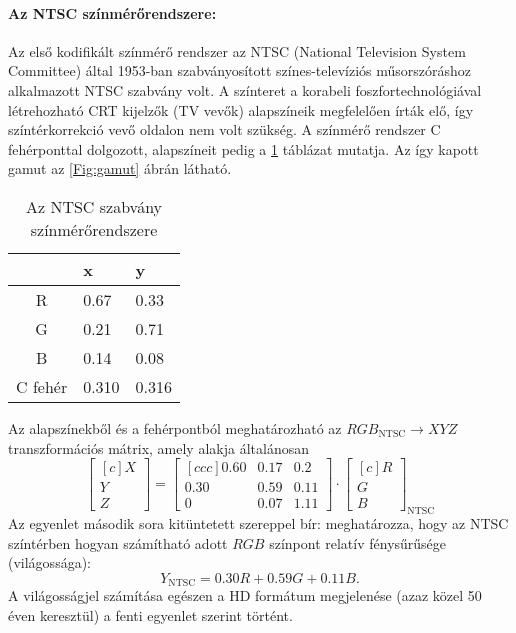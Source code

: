 \paragraph{Az NTSC színmérőrendszere:\\}
Az első kodifikált színmérő rendszer az NTSC (National Television System Committee) által 1953-ban szabványosított színes-televíziós műsorszóráshoz alkalmazott NTSC szabvány volt.
A színteret a korabeli foszfortechnológiával létrehozható CRT kijelzők (TV vevők) alapszíneik megfelelően írták elő, így színtérkorrekció vevő oldalon nem volt szükség.
A színmérő rendszer C fehérponttal dolgozott, alapszíneit pedig a \ref{tab:ntsc_colorimetry} táblázat mutatja.
Az így kapott gamut az \ref{Fig:gamut} ábrán látható.
\begin{table}[h!]
\caption{Az NTSC szabvány színmérőrendszere}
\renewcommand*{\arraystretch}{1}
\label{tab:ntsc_colorimetry}
\begin{center}
\small\addtolength{\tabcolsep}{15pt}
    \begin{tabular}[h!]{ @{}c | | l | l @{} }%
		&   x  	&    y \\ \hline
    R   &  0.67 &	0.33 \\
    G   &  0.21 &   0.71  \\
    B   & 0.14   &	0.08\\
    C fehér     &  0.310 &	0.316  \\
    \end{tabular}
\end{center}
\end{table}
Az alapszínekből és a fehérpontból meghatározható az $RGB_{\mathrm{NTSC}} \rightarrow XYZ$ transzformációs mátrix, amely alakja általánosan
\begin{equation}
\begin{bmatrix}[c]
       X \\[0.3em]
       Y \\[0.3em]
       Z \end{bmatrix}
       = 
  \begin{bmatrix}[c c c]
   0.60 & 0.17 & 0.2  \\
   0.30 & 0.59 & 0.11 \\
   0 & 0.07 & 1.11
\end{bmatrix}
\cdot
\begin{bmatrix}[c]
       R \\[0.3em]
       G \\[0.3em]
       B \end{bmatrix}_{\mathrm{NTSC}}
\label{Eq:NTSC_transform}
\end{equation}
Az egyenlet második sora kitüntetett szereppel bír: meghatározza, hogy az NTSC színtérben hogyan számítható adott $RGB$ színpont relatív fénysűrűsége (világossága):
\begin{equation}Y_{\mathrm{NTSC}} = 
   0.30R + 0.59G + 0.11 B. 
\label{Eq:NTSC_luminance}
\end{equation}
A világosságjel számítása egészen a HD formátum megjelenése (azaz közel 50 éven keresztül) a fenti egyenlet szerint történt.

